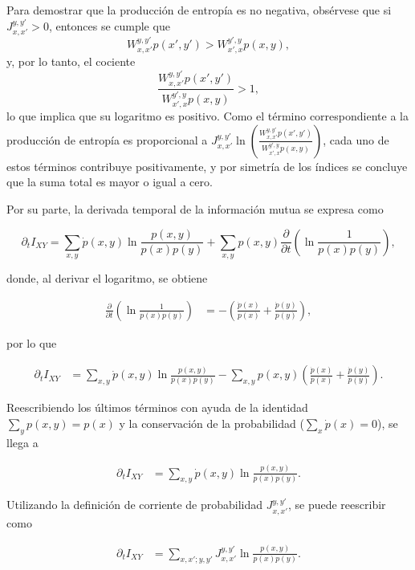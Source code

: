 \begin{appendixs}
Para demostrar que la producción de entropía es no negativa, obsérvese que si \( J_{x,x'}^{y,y'} > 0 \), entonces se cumple que 
\[
W_{x,x'}^{y,y'} p(x',y') > W_{x',x}^{y',y} p(x,y),
\]
y, por lo tanto, el cociente
\[
\frac{W_{x,x'}^{y,y'} p(x',y')}{W_{x',x}^{y',y} p(x,y)} > 1,
\]
lo que implica que su logaritmo es positivo. Como el término correspondiente a la producción de entropía es proporcional a \( J_{x,x'}^{y,y'} \ln \left( \frac{W_{x,x'}^{y,y'} p(x',y')}{W_{x',x}^{y',y} p(x,y)} \right) \), cada uno de estos términos contribuye positivamente, y por simetría de los índices se concluye que la suma total es mayor o igual a cero.

Por su parte, la derivada temporal de la información mutua se expresa como

\begin{equation*}
    \partial_{t} I_{XY} = \sum_{x,y} \dot{p}(x,y) \ln \frac{p(x,y)}{p(x)p(y)} + \sum_{x,y} p(x,y) \frac{\partial}{\partial t} \left( \ln \frac{1}{p(x)p(y)} \right),
\end{equation*}

donde, al derivar el logaritmo, se obtiene

\begin{align*}
    \frac{\partial}{\partial t} \left( \ln \frac{1}{p(x)p(y)} \right) 
    &= - \left( \frac{\dot{p}(x)}{p(x)} + \frac{\dot{p}(y)}{p(y)} \right),
\end{align*}

por lo que

\begin{align*}
    \partial_{t} I_{XY} &= \sum_{x,y} \dot{p}(x,y) \ln \frac{p(x,y)}{p(x)p(y)} 
    - \sum_{x,y} p(x,y) \left( \frac{\dot{p}(x)}{p(x)} + \frac{\dot{p}(y)}{p(y)} \right).
\end{align*}

Reescribiendo los últimos términos con ayuda de la identidad \(\sum_{y} p(x,y) = p(x)\) y la conservación de la probabilidad (\(\sum_{x} \dot{p}(x) = 0\)), se llega a

\begin{align}
    \partial_{t} I_{XY} 
    &= \sum_{x,y} \dot{p}(x,y) \ln \frac{p(x,y)}{p(x)p(y)}.
\end{align}

Utilizando la definición de corriente de probabilidad \(J_{x,x'}^{y,y'}\), se puede reescribir como

\begin{align}
    \partial_{t} I_{XY} &= \sum_{x,x';y,y'} J_{x,x'}^{y,y'} \ln \frac{p(x,y)}{p(x)p(y)}.
\end{align}


\end{appendixs}
